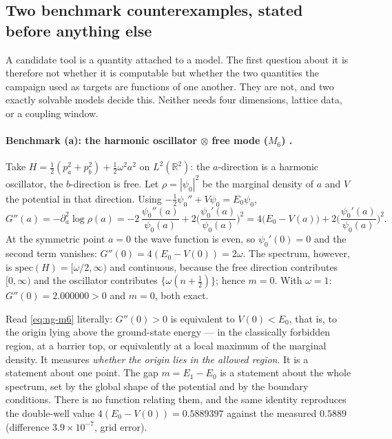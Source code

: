 \subsection{Two benchmark counterexamples, stated before anything else}
\label{sec:ng-bench}

A candidate tool is a quantity attached to a model. The first question about it is therefore not
whether it is computable but whether the two quantities the campaign used as targets are functions
of one another. They are not, and two exactly solvable models decide this. Neither needs four
dimensions, lattice data, or a coupling window.

\paragraph{Benchmark (a): the harmonic oscillator $\otimes$ free mode ($M_6$) \LT.}
Take $H=\tfrac12(p_a^2+p_b^2)+\tfrac12\omega^2a^2$ on $L^2(\mathbb R^2)$: the $a$-direction is a
harmonic oscillator, the $b$-direction is free. Let $\rho=|\psi_0|^2$ be the marginal density of
$a$ and $V$ the potential in that direction. Using $-\tfrac12\psi_0''+V\psi_0=E_0\psi_0$,
\begin{equation}
G''(a)=-\partial_a^2\log\rho(a)
      =-2\,\frac{\psi_0''(a)}{\psi_0(a)}+2\Big(\frac{\psi_0'(a)}{\psi_0(a)}\Big)^{2}
      =4\big(E_0-V(a)\big)+2\Big(\frac{\psi_0'(a)}{\psi_0(a)}\Big)^{2}.
\label{eq:ng-m6}
\end{equation}
At the symmetric point $a=0$ the wave function is even, so $\psi_0'(0)=0$ and the second term
vanishes: $G''(0)=4(E_0-V(0))=2\omega$. The spectrum, however, is $\mathrm{spec}(H)=[\omega/2,\infty)$
and continuous, because the free direction contributes $[0,\infty)$ and the oscillator contributes
$\{\omega(n+\tfrac12)\}$; hence $m=0$. With $\omega=1$: $G''(0)=2.000000>0$ and $m=0$, both exact.

Read \eqref{eq:ng-m6} literally: $G''(0)>0$ is equivalent to $V(0)<E_0$, that is, to the origin
lying above the ground-state energy --- in the classically forbidden region, at a barrier top, or
equivalently at a local maximum of the marginal density. It measures \emph{whether the origin lies in
the allowed region}. It is a statement about one point. The gap $m=E_1-E_0$ is a statement about the
whole spectrum, set by the global shape of the potential and by the boundary conditions. There is no
function relating them, and the same identity reproduces the double-well value
$4(E_0-V(0))=0.5889397$ against the measured $0.5889$ (difference $3.9\times10^{-7}$, grid error).


